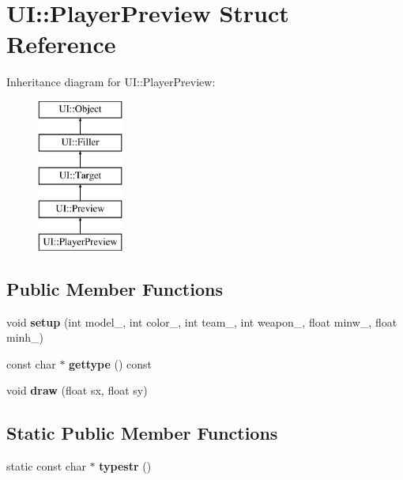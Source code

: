 \hypertarget{struct_u_i_1_1_player_preview}{}\section{UI\+:\+:Player\+Preview Struct Reference}
\label{struct_u_i_1_1_player_preview}
Inheritance diagram for UI\+:\+:Player\+Preview\+:\begin{figure}[H]
\begin{center}
\leavevmode
\includegraphics[height=5.000000cm]{struct_u_i_1_1_player_preview}
\end{center}
\end{figure}
\subsection*{Public Member Functions}
\begin{DoxyCompactItemize}
\item 
\mbox{\label{struct_u_i_1_1_player_preview_a033975e4fc3cec567b25165bff133ab2}} 
void {\bfseries setup} (int model\+\_\+, int color\+\_\+, int team\+\_\+, int weapon\+\_\+, float minw\+\_\+, float minh\+\_\+)
\item 
\mbox{\label{struct_u_i_1_1_player_preview_a07d2262c52bf268616bcb9d7e906203f}} 
const char $\ast$ {\bfseries gettype} () const
\item 
\mbox{\label{struct_u_i_1_1_player_preview_a1235077d270be9ca4d1cfee5426d96ca}} 
void {\bfseries draw} (float sx, float sy)
\end{DoxyCompactItemize}
\subsection*{Static Public Member Functions}
\begin{DoxyCompactItemize}
\item 
\mbox{\label{struct_u_i_1_1_player_preview_a0fa495b9fad54f5646e865a31cb30b7e}} 
static const char $\ast$ {\bfseries typestr} ()
\end{DoxyCompactItemize}

